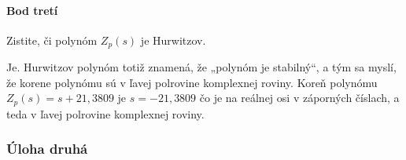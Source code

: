 \documentclass[a4paper, 10pt, ]{article}
\begin{document}
\paragraph{Bod tretí}

\smallskip

{\color{gray}

Zistite, či polynóm $Z_p(s)$ je Hurwitzov.

}

\smallskip


\noindent
Je. Hurwitzov polynóm totiž znamená, že „polynóm je stabilný“, a tým sa myslí, že korene polynómu sú v ľavej polrovine komplexnej roviny. Koreň polynómu $Z_p(s) = s + 21,3809$ je $s = -21,3809$ čo je na reálnej osi v záporných číslach, a teda v ľavej polrovine komplexnej roviny.






















\subsubsection{Úloha druhá}


\smallskip
\end{document}
